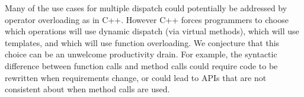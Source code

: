 \documentclass[10pt, preprint]{sigplanconf}
\begin{document}
Many of the use cases for multiple dispatch could potentially be addressed
by operator overloading as in C++. However C++ forces programmers to choose
which operations will use dynamic dispatch (via virtual methods), which will
use templates, and which will use function overloading. We conjecture that
this choice can be an unwelcome productivity drain. For example, the
syntactic difference between function calls and method calls could require
code to be rewritten when requirements change, or could lead to APIs that
are not consistent about when method calls are used.







\end{document}
